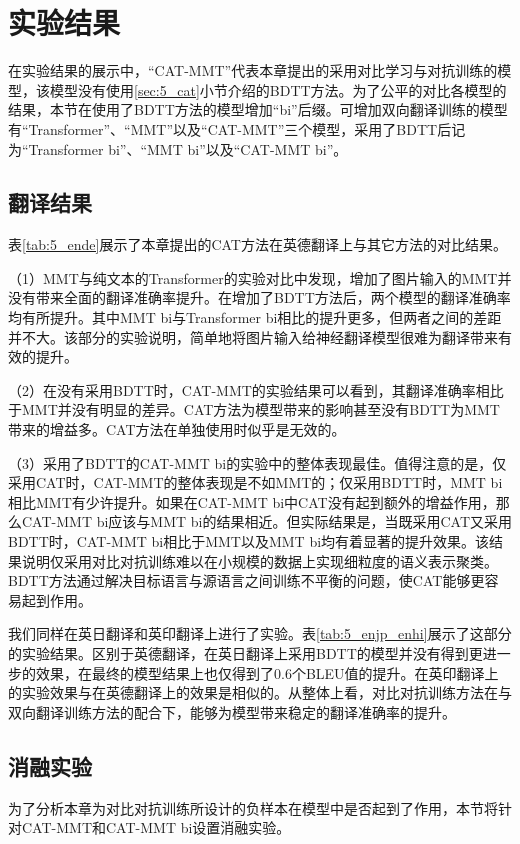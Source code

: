 \section{实验结果}

在实验结果的展示中，“CAT-MMT”代表本章提出的采用对比学习与对抗训练的模型，该模型没有使用\ref{sec:5_cat}小节介绍的BDTT方法。为了公平的对比各模型的结果，本节在使用了BDTT方法的模型增加“bi”后缀。可增加双向翻译训练的模型有“Transformer”、“MMT”以及“CAT-MMT”三个模型，采用了BDTT后记为“Transformer bi”、“MMT bi”以及“CAT-MMT bi”。

\subsection{翻译结果}
\label{sec:5_translation_results}


表\ref{tab:5_ende}展示了本章提出的CAT方法在英德翻译上与其它方法的对比结果。

（1）MMT与纯文本的Transformer的实验对比中发现，增加了图片输入的MMT并没有带来全面的翻译准确率提升。在增加了BDTT方法后，两个模型的翻译准确率均有所提升。其中MMT bi与Transformer bi相比的提升更多，但两者之间的差距并不大。该部分的实验说明，简单地将图片输入给神经翻译模型很难为翻译带来有效的提升。

（2）在没有采用BDTT时，CAT-MMT的实验结果可以看到，其翻译准确率相比于MMT并没有明显的差异。CAT方法为模型带来的影响甚至没有BDTT为MMT带来的增益多。CAT方法在单独使用时似乎是无效的。

（3）采用了BDTT的CAT-MMT bi的实验中的整体表现最佳。值得注意的是，仅采用CAT时，CAT-MMT的整体表现是不如MMT的；仅采用BDTT时，MMT bi相比MMT有少许提升。如果在CAT-MMT bi中CAT没有起到额外的增益作用，那么CAT-MMT bi应该与MMT bi的结果相近。但实际结果是，当既采用CAT又采用BDTT时，CAT-MMT bi相比于MMT以及MMT bi均有着显著的提升效果。该结果说明仅采用对比对抗训练难以在小规模的数据上实现细粒度的语义表示聚类。BDTT方法通过解决目标语言与源语言之间训练不平衡的问题，使CAT能够更容易起到作用。

我们同样在英日翻译和英印翻译上进行了实验。表\ref{tab:5_enjp_enhi}展示了这部分的实验结果。区别于英德翻译，在英日翻译上采用BDTT的模型并没有得到更进一步的效果，在最终的模型结果上也仅得到了0.6个BLEU值的提升。在英印翻译上的实验效果与在英德翻译上的效果是相似的。从整体上看，对比对抗训练方法在与双向翻译训练方法的配合下，能够为模型带来稳定的翻译准确率的提升。

\subsection{消融实验}
\label{sec:5_ablation_study}

为了分析本章为对比对抗训练所设计的负样本在模型中是否起到了作用，本节将针对CAT-MMT和CAT-MMT bi设置消融实验。

